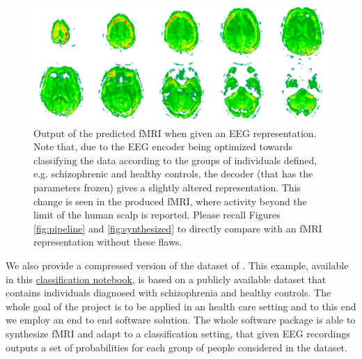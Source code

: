 \begin{figure}[t]
    \centering
    \includegraphics[width=\textwidth]{figures/discriminative.png}
    \caption{Output of the predicted fMRI when given an EEG representation. Note that, due to the EEG encoder being optimized towards classifying the data according to the groups of individuals defined, e.g. schizophrenic and healthy controls, the decoder (that has the parameters frozen) gives a slightly altered representation. This change is seen in the produced fMRI, where activity beyond the limit of the human scalp is reported. Please recall Figures \ref{fig:pipeline} and \ref{fig:synthesized} to directly compare with an fMRI representation without these flaws.}
    \label{fig:discriminative}
\end{figure}
We also provide a compressed version of the dataset of \cite{dataset2022fribourg}. This example, available in this \href{https://github.com/eeg-to-fmri/eeg-to-fmri/blob/main/examples/classification_contrastive.ipynb}{classification notebook}, is based on a publicly available dataset that contains individuals diagnosed with schizophrenia and healthy controls. The whole goal of the project is to be applied in an health care setting and to this end we employ an end to end software solution. The whole software package is able to synthesize fMRI and adapt to a classification setting, that given EEG recordings outputs a set of probabilities for each group of people considered in the dataset.



